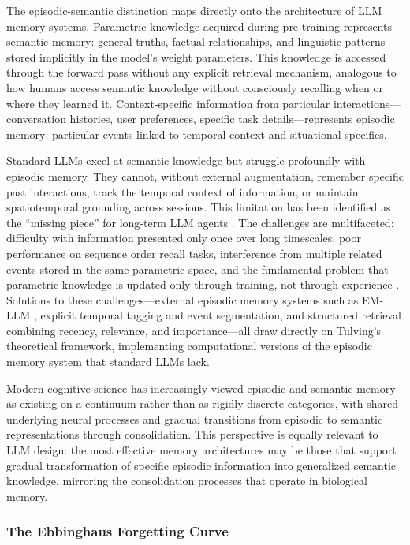 \documentclass[11pt,letterpaper]{article}
\begin{document}
The episodic-semantic distinction maps directly onto the architecture of LLM memory systems. Parametric knowledge acquired during pre-training represents semantic memory: general truths, factual relationships, and linguistic patterns stored implicitly in the model's weight parameters. This knowledge is accessed through the forward pass without any explicit retrieval mechanism, analogous to how humans access semantic knowledge without consciously recalling when or where they learned it. Context-specific information from particular interactions---conversation histories, user preferences, specific task details---represents episodic memory: particular events linked to temporal context and situational specifics.

Standard LLMs excel at semantic knowledge but struggle profoundly with episodic memory. They cannot, without external augmentation, remember specific past interactions, track the temporal context of information, or maintain spatiotemporal grounding across sessions. This limitation has been identified as the ``missing piece'' for long-term LLM agents \cite{sun2025episodic}. The challenges are multifaceted: difficulty with information presented only once over long timescales, poor performance on sequence order recall tasks, interference from multiple related events stored in the same parametric space, and the fundamental problem that parametric knowledge is updated only through training, not through experience \cite{ning2025episodic}. Solutions to these challenges---external episodic memory systems such as EM-LLM \cite{hu2025emllm}, explicit temporal tagging and event segmentation, and structured retrieval combining recency, relevance, and importance---all draw directly on Tulving's theoretical framework, implementing computational versions of the episodic memory system that standard LLMs lack.

Modern cognitive science has increasingly viewed episodic and semantic memory as existing on a continuum rather than as rigidly discrete categories, with shared underlying neural processes and gradual transitions from episodic to semantic representations through consolidation. This perspective is equally relevant to LLM design: the most effective memory architectures may be those that support gradual transformation of specific episodic information into generalized semantic knowledge, mirroring the consolidation processes that operate in biological memory.

\subsubsection{The Ebbinghaus Forgetting Curve}
\end{document}
